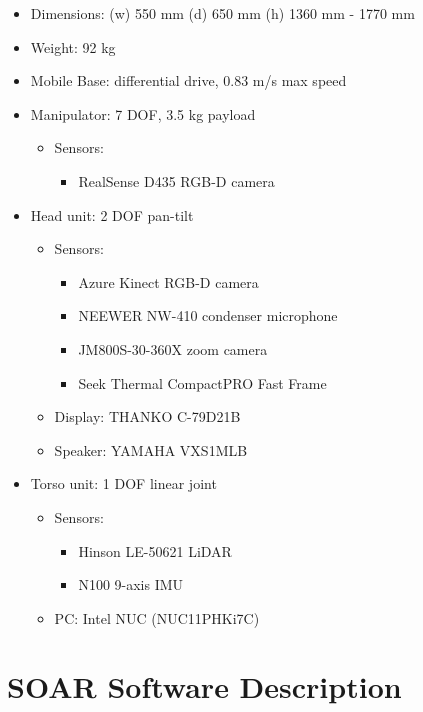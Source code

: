 \begin{itemize}
	\item Dimensions: (w) 550 mm (d) 650 mm (h) 1360 mm - 1770 mm
	\item Weight: 92 kg
	\item Mobile Base: differential drive, 0.83 m/s max speed
	\item Manipulator: 7 DOF, 3.5 kg payload
	      \begin{itemize}
		      \item Sensors:
		            \begin{itemize}
			            \item RealSense D435 RGB-D camera
		            \end{itemize}
	      \end{itemize}
	\item Head unit: 2 DOF pan-tilt
	      \begin{itemize}
		      \item Sensors:
		            \begin{itemize}
			            \item Azure Kinect RGB-D camera
			            \item NEEWER NW-410 condenser microphone
			            \item JM800S-30-360X zoom camera
			            \item Seek Thermal CompactPRO Fast Frame
		            \end{itemize}
		      \item Display: THANKO C-79D21B
		      \item Speaker: YAMAHA VXS1MLB
	      \end{itemize}
	\item Torso unit: 1 DOF linear joint
	      \begin{itemize}
		      \item Sensors:
		            \begin{itemize}
			            \item Hinson LE-50621 LiDAR
			            \item N100 9-axis IMU
		            \end{itemize}
		      \item PC: Intel NUC (NUC11PHKi7C)
	      \end{itemize}
\end{itemize}

\section*{SOAR Software Description}

